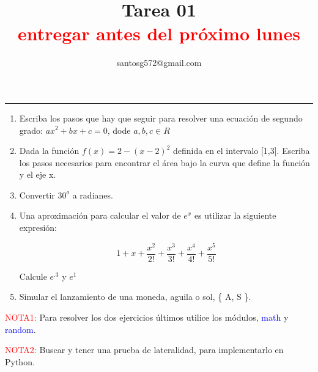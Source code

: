 \documentclass[a4paper]{article}
\title{Tarea 01 \\ \textcolor{red}{\small entregar antes del próximo lunes }}
\author{\small santosg572@gmail.com }
\begin{document}
\maketitle

\hrule

\begin{enumerate}
\item Escriba los pasos que hay que seguir para resolver una ecuación de segundo grado: $ax^2+bx+c=0$, dode $a,b, c 
\in R$
\item Dada la función $f(x) = 2 - (x-2)^2$ definida en el intervalo [1,3]. 
Escriba los pasos necesarios para encontrar el área bajo la curva que define la función y el eje x.
\item Convertir $30^o$ a radianes.
\item Una aproximación para calcular el valor de $e^x$ es utilizar la siguiente expresión:

\[
1 + x + \frac{x^2}{2!} + \frac{x^3}{3!} + \frac{x^4}{4!} + \frac{x^5}{5!}
\]   

Calcule $e^{.3}$ y $e^{1}$

\item Simular el lanzamiento de una moneda, aguila o sol, \{ A, S \}.

\end{enumerate}

 \textcolor{red}{\small NOTA1: } Para resolver los dos ejercicios últimos utilice los módulos, 
 \textcolor{blue}{math} y  \textcolor{blue}{random}.

\textcolor{red}{\small NOTA2: } Buscar y tener una prueba de lateralidad, para implementarlo en Python.
  
\end{document}
